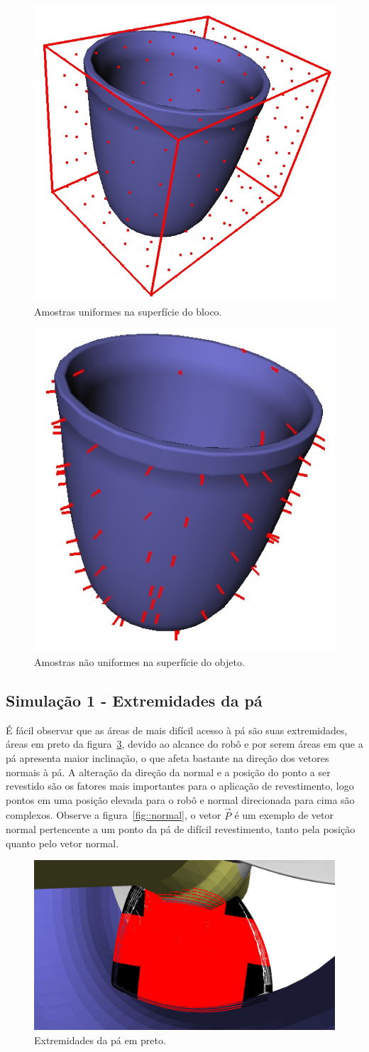 \begin{figure}[!ht]	
	\centering
	\includegraphics[width=.3\columnwidth]{figs/boundingbox.jpg}
	\caption{Amostras uniformes na superfície do bloco.}
	\label{fig::boundingbox}
\end{figure}

\begin{figure}[!ht]
	\centering	
	\includegraphics[width=.3\columnwidth]{figs/sampling.jpg}
	\caption{Amostras não uniformes na superfície do objeto.}
	\label{fig::sampling}
\end{figure}

\subsection{Simulação 1 - Extremidades da pá}

É fácil observar que as áreas de mais difícil acesso à pá são suas extremidades,
áreas em preto da figura~\ref{fig::extremidades}, devido ao alcance do robô e
por serem áreas em que a pá apresenta maior inclinação, o que afeta bastante na
direção dos vetores normais à pá. A alteração da direção da normal e a posição
do ponto a ser revestido são os fatores mais importantes para o aplicação de
revestimento, logo pontos em uma posição elevada para o robô e normal
direcionada para cima são complexos. Observe a figura~\ref{fig::normal}, o vetor
$\vec{P}$ é um exemplo de vetor normal pertencente a um ponto da pá de difícil
revestimento, tanto pela posição quanto pelo vetor normal.

\begin{figure}[!ht]
	\centering	
	\includegraphics[width=.8\columnwidth]{figs/tocoat.jpg}
	\caption{Extremidades da pá em preto.}
	\label{fig::extremidades}
\end{figure}

